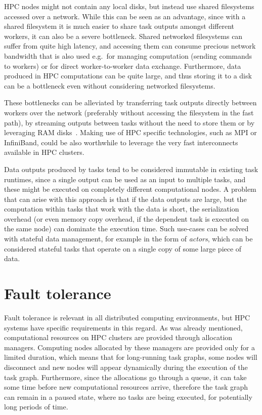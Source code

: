 HPC nodes might not contain any local disks, but instead use shared filesystems accessed over a
network. While this can be seen as an advantage, since with a shared filesystem it is much easier
to share task outputs amongst different workers, it can also be a severe bottleneck. Shared
networked filesystems can suffer from quite high latency, and accessing them can consume precious
network bandwidth that is also used e.g.\ for managing computation (sending commands to workers) or
for direct worker-to-worker data exchange. Furthermore, data produced in HPC computations can be
quite large, and thus storing it to a disk can be a bottleneck even without considering networked
filesystems.

These bottlenecks can be alleviated by transferring task outputs directly between workers over the
network (preferably without accessing the filesystem in the fast path), by streaming outputs
between tasks without the need to store them or by leveraging RAM disks~\cite{hyperloom}.
Making use of HPC specific technologies, such as MPI or InfiniBand, could be also worthwhile to
leverage the very fast interconnects available in HPC clusters.

Data outputs produced by tasks tend to be considered immutable in existing task runtimes, since a
single output can be used as an input to multiple tasks, and these might be executed on completely
different computational nodes. A problem that can arise with this approach is that if the data
outputs are large, but the computation within tasks that work with the data is short, the
serialization overhead (or even memory copy overhead, if the dependent task is executed on the same
node) can dominate the execution time. Such use-cases can be solved with stateful data management,
for example in the form of \emph{actors}, which can be considered stateful tasks that
operate on a single copy of some large piece of data.

\section{Fault tolerance}
Fault tolerance is relevant in all distributed computing environments, but HPC systems have
specific requirements in this regard. As was already mentioned, computational resources on HPC
clusters are provided through allocation managers. Computing nodes allocated by these managers are
provided only for a limited duration, which means that for long-running task graphs, some nodes
will disconnect and new nodes will appear dynamically during the execution of the task graph.
Furthermore, since the allocations go through a queue, it can take some time before new
computational resources arrive, therefore the task graph can remain in a paused state, where no
tasks are being executed, for potentially long periods of time.

